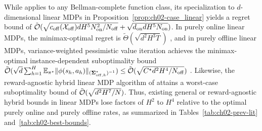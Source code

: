 While  applies to any Bellman-complete function class, its specialization to $d$-dimensional linear MDPs in Proposition~\ref{prop:ch02-case_linear} yields a regret bound of $\tilde{{\mathcal{O}}}(\sqrt{c_{{\operatorname{off}}}({\mathcal{X}}_{{\operatorname{off}}}) d H^5 N_{{\operatorname{on}}}^2 / N_{{\operatorname{off}}}} + \sqrt{d_{{\operatorname{on}}} d H^5 N_{{\operatorname{on}}}})$. In purely online linear MDPs, the minimax-optimal regret is $\tilde{\Theta}(\sqrt{d^2 H^3 T})$ \citep{zhou2021nearly, he2023nearly, hu2023nearlynot, agarwal2023vo}, and in purely offline linear MDPs, variance-weighted pessimistic value iteration achieves the minimax-optimal instance-dependent suboptimality bound $\tilde{{\mathcal{O}}}(\sqrt{d}\sum_{h=1}^H \mathbb{E}_{\pi^\star}\|\phi(s_h, a_h)\|_{({\bm{\Sigma}}_{{\operatorname{off}}, h}^\star)^{-1}}) \leq \tilde{{\mathcal{O}}}(\sqrt{C^\star d^2 H^4 / N_{{\operatorname{off}}}})$ \citep{xiong2023nearly}. Likewise, the reward-agnostic hybrid linear MDP algorithm of \citet{wagenmaker2023leveraging} attains a worst-case suboptimality bound of $\tilde{{\mathcal{O}}}(\sqrt{d^2 H^7 / N})$. Thus, existing general or reward-agnostic hybrid bounds in linear MDPs lose factors of $H^2$ to $H^4$ relative to the optimal purely online and purely offline rates, as summarized in Tables~\ref{tab:ch02-prev-lit} and~\ref{tab:ch02-best-bounds}.

\begin{table}[htbp]
\centering
{}
\caption[Comparison of hybrid RL approaches and coverage assumptions]{Comparison of hybrid RL approaches by function approximation class, coverage assumptions, and whether they improve upon purely offline or purely online minimax lower bounds.}
\label{tab:ch02-prev-lit}
\end{table}

